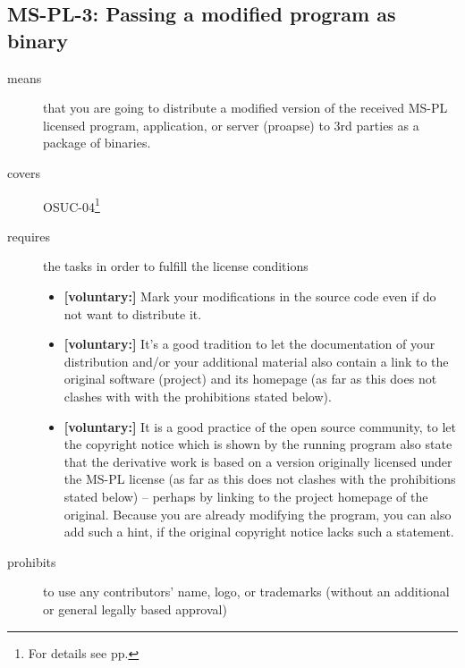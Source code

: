 \subsection{MS-PL-3: Passing a modified program as binary}

\begin{description}

\item[means] that you are going to distribute a modified version of the received
MS-PL licensed program, application, or server (proapse) to 3rd parties as a
package of binaries.

\item[covers] OSUC-04\footnote{For details see pp. \pageref{OSUC-04-DEF}}

\item[requires] the tasks in order to fulfill the license conditions
\begin{itemize}
  
  \item \textbf{[voluntary:]} Mark your modifications in the source code even if
  do not want to distribute it.
  
  \item \textbf{[voluntary:]} It's a good tradition to let the documentation of
  your distribution and/or your additional material also contain a link to the
  original software (project) and its homepage (as far as this does not clashes
  with with the prohibitions stated below).
  
  \item \textbf{[voluntary:]} It is a good practice of the open source
  community, to let the copyright notice which is shown by the running program
  also state that the derivative work is based on a version originally licensed
  under the MS-PL license (as far as this does not clashes with the prohibitions
  stated below) -- perhaps by linking to the project homepage of the original.
  Because you are already modifying the program, you can also add such a hint,
  if the original copyright notice lacks such a statement.
    
\end{itemize}

\item[prohibits] to use any contributors' name, logo, or trademarks (without an
additional or general legally based approval)

\end{description}



